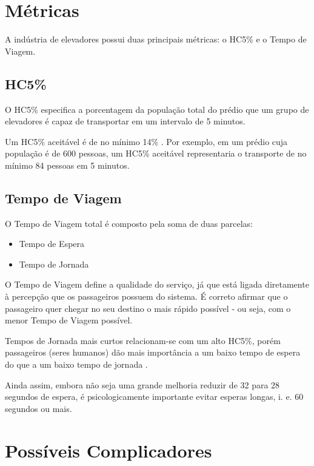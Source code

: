 \section{Métricas}

  A indústria de elevadores possui duas principais métricas: o HC5\% e o Tempo de Viagem.

\subsection{HC5\%}

 O HC5\% especifica a porcentagem da população total do prédio que um grupo de elevadores é capaz de transportar em um intervalo de 5 minutos.

 Um HC5\% aceitável é de no mínimo 14\% \cite{KOEHLEROTTIGER02}. Por exemplo, em um prédio cuja população é de 600 pessoas, um HC5\% aceitável representaria o transporte de no mínimo 84 pessoas em 5 minutos.

\subsection{Tempo de Viagem}

  O Tempo de Viagem total é composto pela soma de duas parcelas:

  \begin{itemize}
    \item Tempo de Espera
    \item Tempo de Jornada
  \end{itemize}

  O Tempo de Viagem define a qualidade do serviço, já que está ligada diretamente à percepção que os passageiros possuem do sistema. É correto afirmar que o passageiro quer chegar no seu destino o mais rápido possível - ou seja, com o menor Tempo de Viagem possível.

  Tempos de Jornada mais curtos relacionam-se com um alto HC5\%, porém passageiros (seres humanos) dão mais importância a um baixo tempo de espera do que a um baixo tempo de jornada \cite{KOEHLEROTTIGER02}.

  Ainda assim, embora não seja uma grande melhoria reduzir de 32 para 28 segundos de espera, é psicologicamente importante evitar esperas longas, i. e. 60 segundos ou mais.

\section{Possíveis Complicadores}

